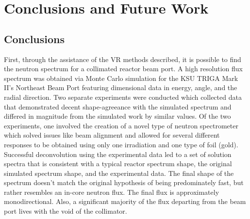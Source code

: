 
\cleardoublepage


\chapter{Conclusions and Future Work}

\section{Conclusions}
First, through the assistance of the VR methods described, it is possible to find the neutron spectrum for a collimated reactor beam port.
A high resolution flux spectrum was obtained via Monte Carlo simulation for the KSU TRIGA Mark II's Northeast Beam Port featuring dimensional data in energy, angle, and the radial direction.
Two separate experiments were conducted which collected data that demonstrated decent shape-agreeance with the simulated spectrum and differed in magnitude from the simulated work by similar values.
Of the two experiments, one involved the creation of a novel type of neutron spectrometer which solved issues like beam alignment and allowed for several different responses to be obtained using only one irradiation and one type of foil (gold).
Successful deconvolution using the experimental data led to a set of solution spectra that is consistent with a typical reactor spectrum shape, the original simulated spectrum shape, and the experimental data.
The final shape of the spectrum doesn't match the original hypothesis of being predominately fast, but rather resembles an in-core neutron flux.
The final flux is approximately monodirectional.
Also, a significant majority of the flux departing from the beam port lives with the void of the collimator.



